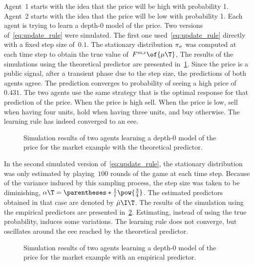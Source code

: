 Agent~1 starts with the idea that the price will be high with probability 1.
Agent~2 starts with the idea that the price will be low with probability 1.
Each agent is trying to learn a depth-\(0\) model of the price.
Two versions of~\cref{eq:update_rule} were simulated.
The first one used~\cref{eq:update_rule} directly with a fixed step size of~\(0.1\).
The stationary distribution \(\pi\strat{\sigma}\) was computed at each time step to obtain the true value of~\(\FF \of{\mu\T}\),
The results of the simulations using the theoretical predictor are presented in~\cref{fig:simulation_theoretical}.
Since the price is a public signal, after a transient phase due to the step size, the predictions of both agents agree.
The prediction converges to probability of seeing a high price of \(0.431\).
The two agents use the same strategy that is the optimal response for that prediction of the price.
When the price is high sell.
When the price is low, sell when having four units, hold when having three units, and buy otherwise.
The learning rule has indeed converged to an \ac{eee}.

\newcommand{\figureswidth}{320pt}
\newcommand{\figuresheight}{170pt}

\begin{figure}[!ht]
  \centering
  \newcommand{\ylabelsymbol}{\(\mu\T\I\elmt{\mathrm{High}}\)}%
  \newcommand{\tabledata}{simulation_theoretical.dat}%
  \begin{tikzpicture}
    
  \end{tikzpicture}
  \caption{Simulation results of two agents learning a depth-0 model of the price for the market example with the theoretical predictor.}
  \label{fig:simulation_theoretical}
\end{figure}

\newpage
In the second simulated version of~\cref{eq:update_rule}, the stationary distribution was only estimated by playing~\(100\) rounds of the game at each time step.
Because of the variance induced by this sampling process, the step size was taken to be diminishing, \(\alpha\T = \parentheses*{\frac{1}{t}}\pow{\frac{3}{4}}\).
The estimated predictors obtained in that case are denoted by \(\hat{\mu}\I\T\).
The results of the simulation using the empirical predictors are presented in~\cref{fig:simulation_empirical}.
Estimating, instead of using the true probability, induces some variations.
The learning rule does not converge, but oscillates around the \ac{eee} reached by the theoretical predictor.

\begin{figure}[!ht]
  \centering
  \newcommand{\ylabelsymbol}{\(\hat{\mu}\T\I\elmt{\mathrm{High}}\)}%
  \newcommand{\tabledata}{simulation_empirical.dat}%
  \begin{tikzpicture}
    
  \end{tikzpicture}
  \caption{Simulation results of two agents learning a depth-0 model of the price for the market example with an empirical predictor.}
  \label{fig:simulation_empirical}
\end{figure}
